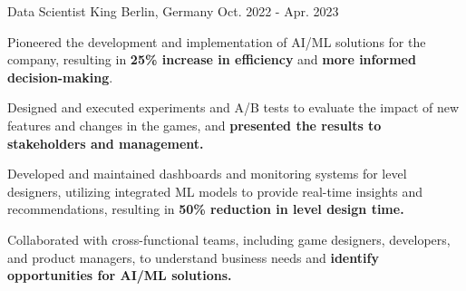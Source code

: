 

\begin{cventries}
  \cventry
    {Data Scientist} %
    {King} %
    {Berlin, Germany} %
    {Oct. 2022 - Apr. 2023} %
    {
      \begin{cvitems} %
        \item {Pioneered the development and implementation of AI/ML solutions for the company, resulting in \textbf{25\% increase in efficiency} and \textbf{more informed decision-making}.}
        \item {Designed and executed experiments and A/B tests to evaluate the impact of new features and changes in the games, and \textbf{presented the results to stakeholders and management.}}
        \item {Developed and maintained dashboards and monitoring systems for level designers, utilizing integrated ML models to provide real-time insights and recommendations, resulting in \textbf{50\% reduction in level design time.}}
        \item {Collaborated with cross-functional teams, including game designers, developers, and product managers, to understand business needs and \textbf{identify opportunities for AI/ML solutions.}}
      \end{cvitems}
    }



\end{cventries}
